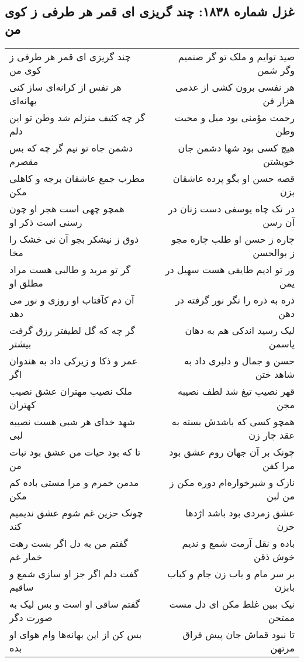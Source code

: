 \begin{center}
\section*{غزل شماره ۱۸۳۸: چند گریزی ای قمر هر طرفی ز کوی من}
\label{sec:1838}
\begin{longtable}{l p{0.5cm} r}
چند گریزی ای قمر هر طرفی ز کوی من
&&
صید توایم و ملک تو گر صنمیم وگر شمن
\\
هر نفس از کرانه‌ای ساز کنی بهانه‌ای
&&
هر نفسی برون کشی از عدمی هزار فن
\\
گر چه کثیف منزلم شد وطن تو این دلم
&&
رحمت مؤمنی بود میل و محبت وطن
\\
دشمن جاه تو نیم گر چه که بس مقصرم
&&
هیچ کسی بود شها دشمن جان خویشتن
\\
مطرب جمع عاشقان برجه و کاهلی مکن
&&
قصه حسن او بگو پرده عاشقان بزن
\\
همچو چهی است هجر او چون رسنی است ذکر او
&&
در تک چاه یوسفی دست زنان در آن رسن
\\
ذوق ز نیشکر بجو آن نی خشک را مخا
&&
چاره ز حسن او طلب چاره مجو ز بوالحسن
\\
گر تو مرید و طالبی هست مراد مطلق او
&&
ور تو ادیم طایفی هست سهیل در یمن
\\
آن دم کآفتاب او روزی و نور می دهد
&&
ذره به ذره را نگر نور گرفته در دهن
\\
گر چه که گل لطیفتر رزق گرفت بیشتر
&&
لیک رسید اندکی هم به دهان یاسمن
\\
عمر و ذکا و زیرکی داد به هندوان اگر
&&
حسن و جمال و دلبری داد به شاهد ختن
\\
ملک نصیب مهتران عشق نصیب کهتران
&&
قهر نصیب تیغ شد لطف نصیبه مجن
\\
شهد خدای هر شبی هست نصیبه لبی
&&
همچو کسی که باشدش بسته به عقد چار زن
\\
تا که بود حیات من عشق بود نبات من
&&
چونک بر آن جهان روم عشق بود مرا کفن
\\
مدمن خمرم و مرا مستی باده کم مکن
&&
نازک و شیرخواره‌ام دوره مکن ز من لبن
\\
چونک حزین غم شوم عشق ندیمیم کند
&&
عشق زمردی بود باشد اژدها حزن
\\
گفتم من به دل اگر بست رهت خمار غم
&&
باده و نقل آرمت شمع و ندیم خوش ذقن
\\
گفت دلم اگر جز او سازی شمع و ساقیم
&&
بر سر مام و باب زن جام و کباب بابزن
\\
گفتم ساقی او است و بس لیک به صورت دگر
&&
نیک ببین غلط مکن ای دل مست ممتحن
\\
بس کن از این بهانه‌ها وام هوای او بده
&&
تا نبود قماش جان پیش فراق مرتهن
\\
\end{longtable}
\end{center}
